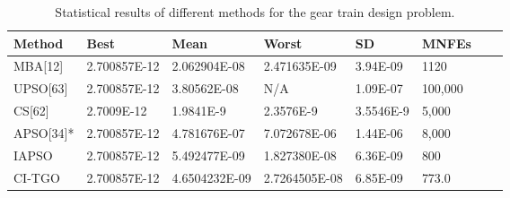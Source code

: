 
\begin{table*}[tp]
    \tiny
\begin{center}

\begin{tabular}{ P{2.0cm} P{2.0cm} P{2.0cm} P{2.0cm} P{2.0cm} P{2.0cm} P{2.0cm} P{2.0cm}  }
\hline
\textbf{Method} & \textbf{Best} & \textbf{Mean} & \textbf{Worst} & \textbf{SD} & \textbf{MNFEs} \\
\hline

MBA[12] & 2.700857E-12 & 2.062904E-08 & 2.471635E-09 & 3.94E-09 & 1120 \\
UPSO[63] & 2.700857E-12 & 3.80562E-08 & N/A & 1.09E-07 & 100,000 \\
CS[62] & 2.7009E-12 & 1.9841E-9 & 2.3576E-9 & 3.5546E-9 & 5,000 \\
APSO[34]* & 2.700857E-12 & 4.781676E-07 & 7.072678E-06 & 1.44E-06 & 8,000 \\
IAPSO & 2.700857E-12 & 5.492477E-09 & 1.827380E-08 & 6.36E-09 & 800 \\
CI-TGO & 2.700857E-12 & 4.6504232E-09 & 2.7264505E-08 & 6.85E-09 & 773.0 \\


\hline
\end{tabular}
\end{center}

\caption{ Statistical results of different methods for the gear train design problem. \\[1em]}
\label{tab:GT}
\end{table*}

